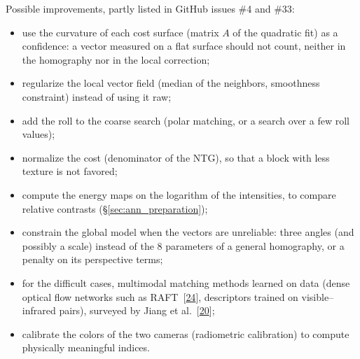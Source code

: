 \documentclass[a4paper,11pt]{report}
\begin{document}
Possible improvements, partly listed in GitHub issues \#4 and \#33:
\begin{itemize}
	\item use the curvature of each cost surface (matrix $A$ of the quadratic fit) as a confidence: a vector measured on a flat surface should not count, neither in the homography nor in the local correction;
	\item regularize the local vector field (median of the neighbors, smoothness constraint) instead of using it raw;
	\item add the roll to the coarse search (polar matching, or a search over a few roll values);
	\item normalize the cost (denominator of the NTG), so that a block with less texture is not favored;
	\item compute the energy maps on the logarithm of the intensities, to compare relative contrasts (\S\ref{sec:ann_preparation});
	\item constrain the global model when the vectors are unreliable: three angles (and possibly a scale) instead of the 8 parameters of a general homography, or a penalty on its perspective terms;
	\item for the difficult cases, multimodal matching methods learned on data (dense optical flow networks such as RAFT~[\hyperref[ann_raft]{24}], descriptors trained on visible--infrared pairs), surveyed by Jiang et al.~[\hyperref[ann_jiang]{20}];
	\item calibrate the colors of the two cameras (radiometric calibration) to compute physically meaningful indices.
\end{itemize}
\end{document}
